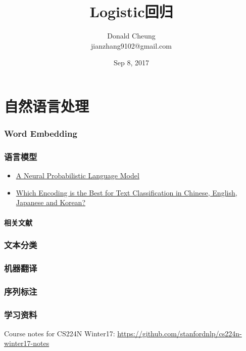 \documentclass[10pt,a4paper]{ctexbook}
\begin{document}
    \setlength{\baselineskip}{20pt}
    \title{Logistic回归}
    \author{Donald Cheung\\jianzhang9102@gmail.com}
    \date{Sep 8, 2017}
    \maketitle
    \tableofcontents
\fi

\chapter{自然语言处理}
\subsection{Word Embedding}
\subsection{语言模型}
\begin{itemize}
\item \href{http://www.jmlr.org/papers/volume3/bengio03a/bengio03a.pdf}{A Neural Probabilistic Language Model}
\item \href{https://arxiv.org/pdf/1708.02657.pdf}{Which Encoding is the Best for Text Classification in Chinese, English, Japanese and Korean?}
\end{itemize}

\subsubsection{相关文献}
\subsection{文本分类}
\subsection{机器翻译}
\subsection{序列标注}

\subsection{学习资料}
Course notes for CS224N Winter17: \url{https://github.com/stanfordnlp/cs224n-winter17-notes}



\ifx\mlbook\undefined
    
\end{document}
